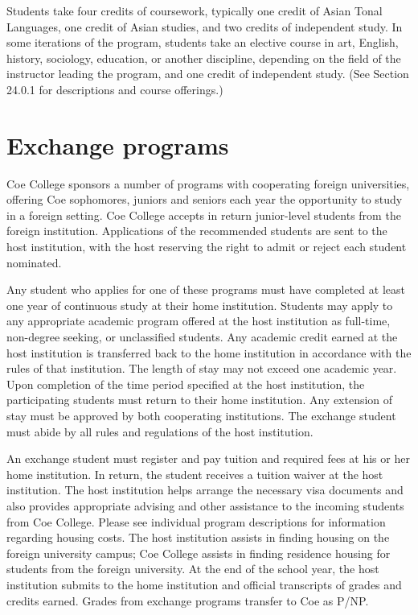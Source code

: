 \documentclass[
  letterpaper,
]{scrbook}
\begin{document}
Students take four credits of coursework, typically one credit of Asian
Tonal Languages, one credit of Asian studies, and two credits of
independent study. In some iterations of the program, students take an
elective course in art, English, history, sociology, education, or
another discipline, depending on the field of the instructor leading the
program, and one credit of independent study. (See Section 24.0.1 for
descriptions and course offerings.)

\section{Exchange programs}\label{exchange-programs}

Coe College sponsors a number of programs with cooperating foreign
universities, offering Coe sophomores, juniors and seniors each year the
opportunity to study in a foreign setting. Coe College accepts in return
junior-level students from the foreign institution. Applications of the
recommended students are sent to the host institution, with the host
reserving the right to admit or reject each student nominated.

Any student who applies for one of these programs must have completed at
least one year of continuous study at their home institution. Students
may apply to any appropriate academic program offered at the host
institution as full-time, non-degree seeking, or unclassified students.
Any academic credit earned at the host institution is transferred back
to the home institution in accordance with the rules of that
institution. The length of stay may not exceed one academic year. Upon
completion of the time period specified at the host institution, the
participating students must return to their home institution. Any
extension of stay must be approved by both cooperating institutions. The
exchange student must abide by all rules and regulations of the host
institution.

An exchange student must register and pay tuition and required fees at
his or her home institution. In return, the student receives a tuition
waiver at the host institution. The host institution helps arrange the
necessary visa documents and also provides appropriate advising and
other assistance to the incoming students from Coe College. Please see
individual program descriptions for information regarding housing costs.
The host institution assists in finding housing on the foreign
university campus; Coe College assists in finding residence housing for
students from the foreign university. At the end of the school year, the
host institution submits to the home institution and official
transcripts of grades and credits earned. Grades from exchange programs
transfer to Coe as P/NP.
\end{document}

